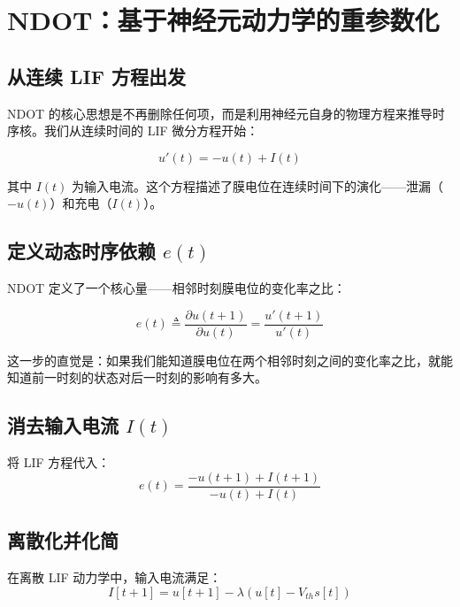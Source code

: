 \documentclass[journal,12pt,onecolumn]{IEEEtran}
\begin{document}
\section{NDOT：基于神经元动力学的重参数化}

\subsection*{从连续 LIF 方程出发}

NDOT 的核心思想是不再删除任何项，而是利用神经元自身的物理方程来推导时序核。我们从连续时间的 LIF 微分方程开始：

\begin{equation}
u'(t) = -u(t) + I(t)
\label{eq.cont_lif}
\end{equation}

其中 $I(t)$ 为输入电流。这个方程描述了膜电位在连续时间下的演化——泄漏（$-u(t)$）和充电（$I(t)$）。

\subsection*{定义动态时序依赖 $e(t)$}

NDOT 定义了一个核心量——相邻时刻膜电位的变化率之比：

\begin{equation}
e(t) \triangleq \frac{\partial u(t+1)}{\partial u(t)}
= \frac{u'(t+1)}{u'(t)}
\label{eq.e_def}
\end{equation}

这一步的直觉是：如果我们能知道膜电位在两个相邻时刻之间的变化率之比，就能知道前一时刻的状态对后一时刻的影响有多大。

\subsection*{消去输入电流 $I(t)$}

将 LIF 方程代入：
\begin{equation}
e(t) = \frac{-u(t+1) + I(t+1)}{-u(t) + I(t)}
\label{eq.e_substitute}
\end{equation}

\subsection*{离散化并化简}

在离散 LIF 动力学中，输入电流满足：
\[
I[t+1] = u[t+1] - \lambda(u[t] - V_{th}s[t])
\]
\end{document}
